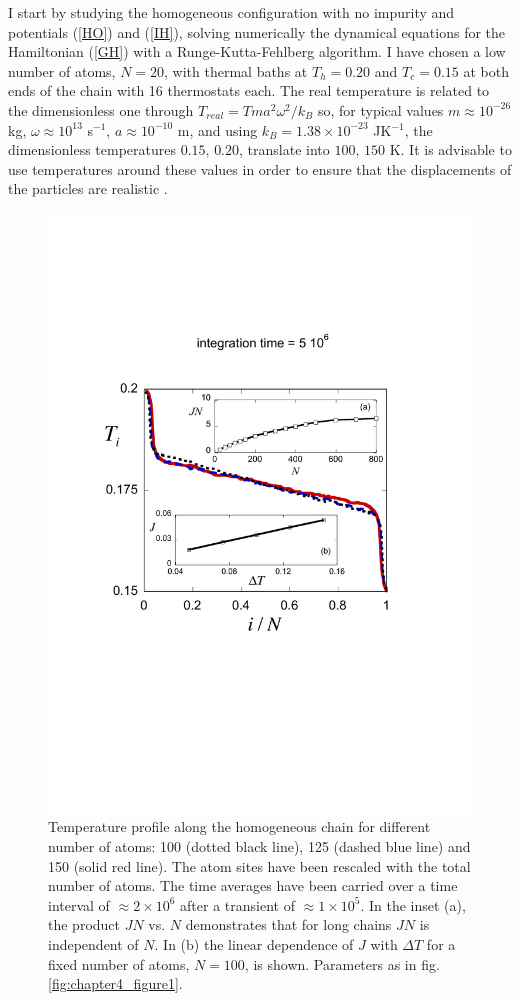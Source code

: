 I start by studying the homogeneous configuration with no impurity and potentials (\ref{HO}) and (\ref{IH}), solving numerically the dynamical equations for  the Hamiltonian (\ref{GH}) with a Runge-Kutta-Fehlberg algorithm. I have chosen a low number of atoms, $N=20$,  with thermal baths at $T_h=0.20$ and $T_c=0.15$ at both ends of the chain with 16 thermostats each. The real temperature is related to the dimensionless one through $T_{real}=T m a^2 \omega^2/k_B$ so, for typical values  $m\approx10^{-26}$ kg, $\omega \approx 10^{13}$ s$^{-1}$, $a\approx 10^{-10}$ m, and using $k_B =1.38 \times 10^{-23}$ JK$^{-1}$,
the dimensionless temperatures $0.15,\, 0.20$, translate into $100,\, 150$ K. It is advisable to use temperatures around these values in order to ensure that the displacements of the particles are realistic \cite{Casati1984}.

\begin{figure}
\centering
\includegraphics[width=0.75\linewidth]{Figures/FIG3.pdf}
\caption{Temperature profile along the homogeneous chain for different number of atoms: 100 (dotted black line), 125 (dashed blue line) and 150 (solid red line). The atom sites have been rescaled with the total number of atoms.
The time averages have been carried over a time interval of $\approx 2 \times 10^6$ after a transient of $\approx 1\times 10^5$. In the inset (a), the product $JN$ vs. $N$ demonstrates that for long chains $JN$ is independent of $N$. In (b) the linear dependence of $J$ with $\Delta T$ for a fixed number of atoms, $N=100$, is shown. Parameters as in fig. \ref{fig:chapter4_figure1}.}
\label{fig:chapter4_figure3}
\end{figure}

